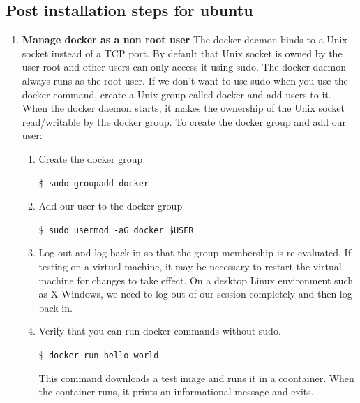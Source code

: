 \subsection{Post installation steps for ubuntu}
\begin{enumerate}
	\item
	\textbf{Manage docker as a non root user}\newline
The docker daemon binds to a Unix socket instead of a TCP port. By default that Unix socket is
owned by the user root and other users can only access it using sudo. The docker daemon always
runs as the root user.
If we don’t want to use sudo when you use the docker command, create a Unix group called docker
and add users to it. When the docker daemon starts, it makes the ownership of the Unix socket
read/writable by the docker group.
To create the docker group and add our user:
	\begin{enumerate}
		\item Create the docker group \newline\begin{center}\verb=$ sudo groupadd docker=\end{center}
		\item Add our user to the docker group \newline\begin{center}\verb=$ sudo usermod -aG docker $USER=\end{center}
		\item Log out and log back in so that the group membership is re-evaluated. If testing on a virtual
machine, it may be necessary to restart the virtual machine for changes to take effect.\newline
On a desktop Linux environment such as X Windows, we need to log out of our session
completely and then log back in.
		\item Verify that you can run docker commands without sudo.\newline\begin{center}\verb=$ docker run hello-world=\end{center}
			This command downloads a test image and runs it in a coontainer. When the container runs, it prints an informational message and exits.
	\end{enumerate}


\end{enumerate}

